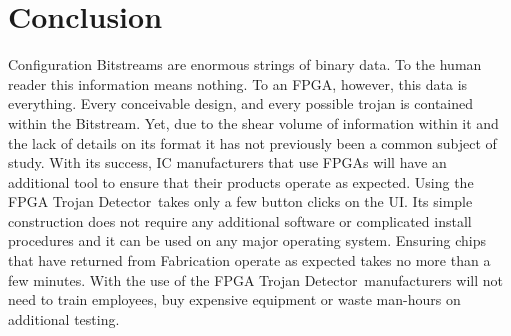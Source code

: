 \documentclass[conference]{IEEEtran}
\newcommand{\Name}{\acrshort{FPGA} Trojan Detector}
\newcommand{\NameNoPeriod}{\Name~}
\begin{document}
\section{Conclusion} \label{sec:conclusion}
Configuration \gls{Bitstream}s are enormous strings of binary data.
To the human reader this information means nothing.
To an \acrshort{FPGA}, however, this data is everything.
Every conceivable design, and every possible trojan is contained within the \gls{Bitstream}.
Yet, due to the shear volume of information within it and the lack of details on its format it has not previously been a common subject of study.
With its success, \acrlong{IC} manufacturers that use \acrshort{FPGA}s will have an additional tool to ensure that their products operate as expected.
Using the \NameNoPeriod takes only a few button clicks on the \acrlong{UI}.
Its simple construction does not require any additional software or complicated install procedures and it can be used on any major operating system.
Ensuring chips that have returned from Fabrication operate as expected takes no more than a few minutes.
With the use of the \NameNoPeriod manufacturers will not need to train employees, buy expensive equipment or waste man-hours on additional testing.






%
%

\printbibliography
\end{document}
